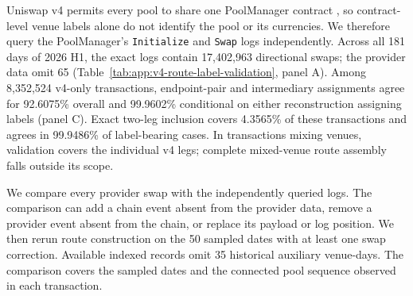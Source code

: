 Uniswap v4 permits every pool to share one PoolManager contract \citep{AdamsEtAl2024UniswapV4}, so contract-level venue labels alone do not identify the pool or its currencies. We therefore query the PoolManager's \texttt{Initialize} and \texttt{Swap} logs independently. Across all 181 days of 2026 H1, the exact logs contain 17,402,963 directional swaps; the provider data omit 65 (Table~\ref{tab:app:v4-route-label-validation}, panel A). Among 8,352,524 v4-only transactions, endpoint-pair and intermediary assignments agree for 92.6075\% overall and 99.9602\% conditional on either reconstruction assigning labels (panel C). Exact two-leg inclusion covers 4.3565\% of these transactions and agrees in 99.9486\% of label-bearing cases. In transactions mixing venues, validation covers the individual v4 legs; complete mixed-venue route assembly falls outside its scope.

\begin{table}[htbp]
\centering
\scriptsize
\caption{Independent validation of Uniswap v4 route labels}
\label{tab:app:v4-route-label-validation}

\end{table}
\FloatBarrier

We compare every provider swap with the independently queried logs. The comparison can add a chain event absent from the provider data, remove a provider event absent from the chain, or replace its payload or log position. We then rerun route construction on the 50 sampled dates with at least one swap correction. Available indexed records omit 35 historical auxiliary venue-days. The comparison covers the sampled dates and the connected pool sequence observed in each transaction.

